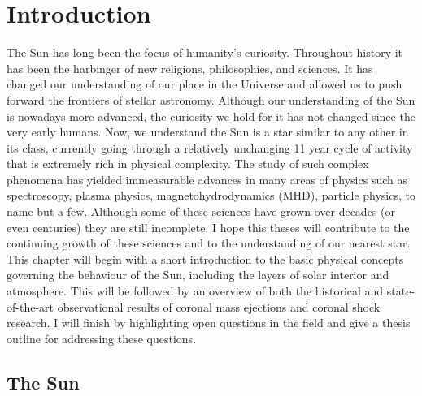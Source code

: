 \singlespacing
\chapter{Introduction}
\label{chap:1}
\vspace{-8mm}
\doublespacing
The Sun has long been the focus of humanity's curiosity. Throughout history it has been the harbinger of new religions, philosophies, and sciences. It has changed our understanding of our place in the Universe and allowed us to push forward the frontiers of stellar astronomy. Although our understanding of the Sun is nowadays more advanced, the curiosity we hold for it has not changed since the very early humans.
Now, we understand the Sun is a star similar to any other in its class, currently going through a relatively unchanging 11 year cycle of activity that is extremely rich in physical complexity. The study of such complex phenomena has yielded immeasurable advances in many areas of physics such as spectroscopy, plasma physics, magnetohydrodynamics (MHD), particle physics, to name but a few. Although some of these sciences have grown over decades (or even centuries) they are still incomplete. I hope this theses will contribute to the continuing growth of these sciences and to the understanding of our nearest star.
\clearpage	
\noindent
This chapter will begin with a short introduction to the basic physical concepts governing the behaviour of the Sun, including the layers of solar interior and atmosphere. This will be followed by an overview of both the historical and state-of-the-art observational results of coronal mass ejections and coronal shock research. I will finish by highlighting open questions in the field and give a thesis outline for addressing these questions.

\section{The Sun}\label{sec:1}


